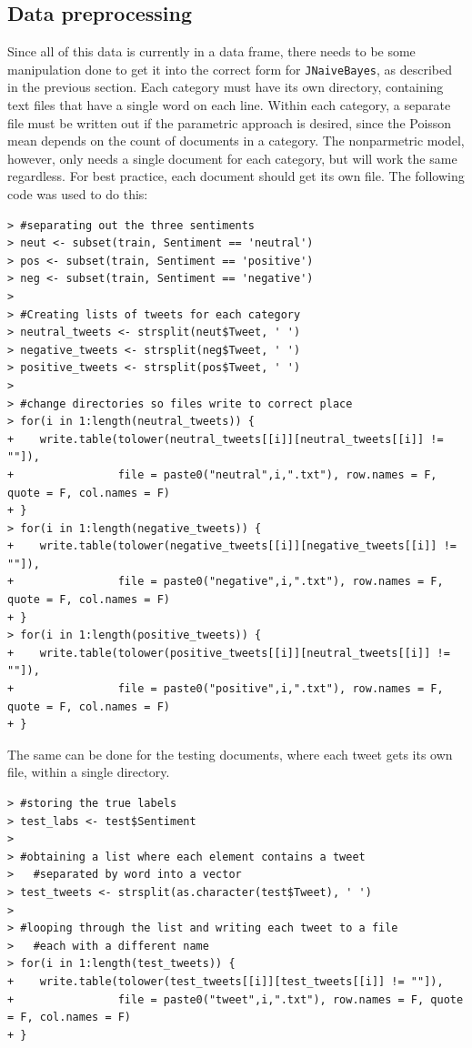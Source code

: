 \documentclass[a4paper]{article}
\begin{document}
\subsection{Data preprocessing}
Since all of this data is currently in a data frame, there needs to be some manipulation done to get it into the correct form for {\tt JNaiveBayes}, as described in the previous section. Each category must have its own directory, containing text files that have a single word on each line. Within each category, a separate file must be written out if the parametric approach is desired, since the Poisson mean depends on the count of documents in a category. The nonparmetric model, however, only needs a single document for each category, but will work the same regardless. For best practice, each document should get its own file. The following code was used to do this:
{\footnotesize{
\begin{verbatim}
> #separating out the three sentiments
> neut <- subset(train, Sentiment == 'neutral') 
> pos <- subset(train, Sentiment == 'positive')
> neg <- subset(train, Sentiment == 'negative')
>
> #Creating lists of tweets for each category
> neutral_tweets <- strsplit(neut$Tweet, ' ')
> negative_tweets <- strsplit(neg$Tweet, ' ')
> positive_tweets <- strsplit(pos$Tweet, ' ')
>
> #change directories so files write to correct place
> for(i in 1:length(neutral_tweets)) {
+    write.table(tolower(neutral_tweets[[i]][neutral_tweets[[i]] != ""]),
+                file = paste0("neutral",i,".txt"), row.names = F, quote = F, col.names = F)
+ }
> for(i in 1:length(negative_tweets)) {
+    write.table(tolower(negative_tweets[[i]][negative_tweets[[i]] != ""]),
+                file = paste0("negative",i,".txt"), row.names = F, quote = F, col.names = F)
+ }
> for(i in 1:length(positive_tweets)) {
+    write.table(tolower(positive_tweets[[i]][neutral_tweets[[i]] != ""]),
+                file = paste0("positive",i,".txt"), row.names = F, quote = F, col.names = F)
+ }
\end{verbatim}}}

\noindent The same can be done for the testing documents, where each tweet gets its own file, within a single directory.
{\footnotesize{
\begin{verbatim}
> #storing the true labels
> test_labs <- test$Sentiment
>
> #obtaining a list where each element contains a tweet 
> 	#separated by word into a vector
> test_tweets <- strsplit(as.character(test$Tweet), ' ')
>
> #looping through the list and writing each tweet to a file
> 	#each with a different name
> for(i in 1:length(test_tweets)) {
+    write.table(tolower(test_tweets[[i]][test_tweets[[i]] != ""]), 
+                file = paste0("tweet",i,".txt"), row.names = F, quote = F, col.names = F)
+ }
\end{verbatim}}}
\end{document}
